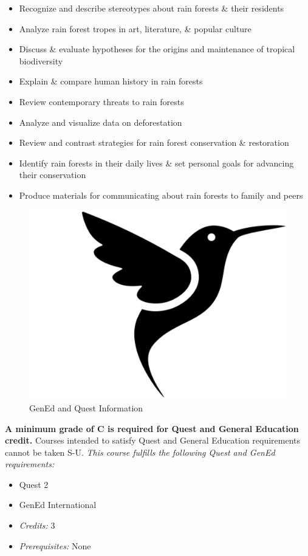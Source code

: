 \documentclass[
  12pt,
]{article}
\providecommand{\tightlist}{%
  \setlength{\itemsep}{0pt}\setlength{\parskip}{0pt}}
\begin{document}
\begin{itemize}
\tightlist
\item
  Recognize and describe stereotypes about rain forests \& their
  residents
\item
  Analyze rain forest tropes in art, literature, \& popular culture
\item
  Discuss \& evaluate hypotheses for the origins and maintenance of
  tropical biodiversity
\item
  Explain \& compare human history in rain forests
\item
  Review contemporary threats to rain forests
\item
  Analyze and visualize data on deforestation
\item
  Review and contrast strategies for rain forest conservation \&
  restoration
\item
  Identify rain forests in their daily lives \& set personal goals for
  advancing their conservation
\item
  Produce materials for communicating about rain forests to family and
  peers
\end{itemize}

\vspace{0.3cm}

\begin{figure}

\includegraphics[width=0.03\linewidth]{./icons/hummingbird} \hfill{}

\caption{GenEd and Quest Information}\label{fig:gened_details}
\end{figure}

\vspace{-0.3cm}

\textbf{A minimum grade of C is required for Quest and General Education
credit.} Courses intended to satisfy Quest and General Education
requirements cannot be taken S-U. \emph{This course fulfills the
following Quest and GenEd requirements:}

\begin{itemize}
\tightlist
\item
  Quest 2
\item
  GenEd International
\item
  \emph{Credits:} 3
\item
  \emph{Prerequisites:} None
\end{itemize}
\end{document}
